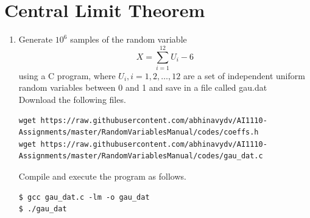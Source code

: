\documentclass[journal,12pt,twocolumn]{IEEEtran}
\renewcommand\thesection{\arabic{section}}
\begin{document}
\section{Central Limit Theorem}
%
\begin{enumerate}[label=\thesection.\arabic*
        ,ref=\thesection.\theenumi]

    \item
          Generate $10^6$ samples of the random variable
          \begin{equation}
              X = \sum_{i=1}^{12}U_i -6
          \end{equation}
          using a C program, where $U_i, i = 1,2,\dots, 12$ are  a set of independent uniform random variables between 0 and 1
          and save in a file called gau.dat\\
          \solution Download the following files.
          \begin{lstlisting}
wget https://raw.githubusercontent.com/abhinavydv/AI1110-Assignments/master/RandomVariablesManual/codes/coeffs.h
wget https://raw.githubusercontent.com/abhinavydv/AI1110-Assignments/master/RandomVariablesManual/codes/gau_dat.c
        \end{lstlisting}

          Compile and execute the program as follows.
          \begin{lstlisting}
$ gcc gau_dat.c -lm -o gau_dat
$ ./gau_dat
        \end{lstlisting}



\end{enumerate}
\end{document}
